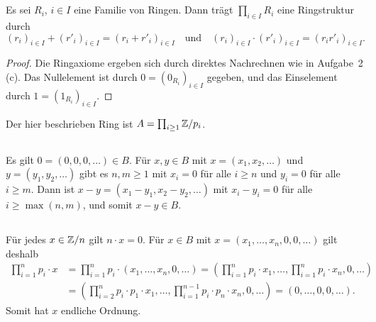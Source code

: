 \section{}





\subsection{}

\begin{lemma}
  Es sei $R_i$, $i \in I$ eine Familie von Ringen.
  Dann trägt $\prod_{i \in I} R_i$ eine Ringstruktur durch
  \[
      (r_i)_{i \in I} + (r'_i)_{i \in I}
    = (r_i + r'_i)_{i \in I}
    \quad\text{und}\quad
      (r_i)_{i \in I} \cdot (r'_i)_{i \in I}
    = (r_i r'_i)_{i \in I}.
  \]
\end{lemma}

\begin{proof}
  Die Ringaxiome ergeben sich durch direktes Nachrechnen wie in Aufgabe~2 (c).
  Das Nullelement ist durch $0 = (0_{R_i})_{i \in I}$ gegeben, und das Einselement durch $1 = (1_{R_i})_{i \in I}$.
\end{proof}

Der hier beschrieben Ring ist $A = \prod_{i \geq 1} \mathbb{Z}/{p_i}$.





\subsection{}

Es gilt $0 = (0, 0, 0, \dotsc) \in B$.
Für $x, y \in B$ mit $x = (x_1, x_2, \dotsc)$ und $y = (y_1, y_2, \dotsc)$ gibt es $n, m \geq 1$ mit $x_i = 0$ für alle $i \geq n$ und $y_i = 0$ für alle $i \geq m$.
Dann ist $x - y = (x_1 - y_1, x_2 - y_2, \dotsc)$ mit $x_i - y_i = 0$ für alle $i \geq \max(n,m)$, und somit $x-y \in B$.





\subsection{}

Für jedes $x \in \mathbb{Z}/n$ gilt $n \cdot x = 0$.
Für $x \in B$ mit $x = (x_1, \dotsc, x_n, 0, 0, \dotsc)$ gilt deshalb
\begin{align*}
      \prod_{i=1}^n p_i \cdot x
  &=  \prod_{i=1}^n p_i \cdot (x_1, \dotsc, x_n, 0, \dotsc)
   =  \left( 
        \prod_{i=1}^n p_i \cdot x_1,
        \dotsc,
        \prod_{i=1}^n p_i \cdot x_n,
        0,
        \dotsc
      \right)
  \\
  &=  \left(
        \prod_{i=2}^n p_i \cdot p_1 \cdot x_1,
        \dotsc,
        \prod_{i=1}^{n-1}  p_i \cdot p_n \cdot x_n, 0,
        \dotsc
      \right)
  = (0, \dotsc, 0, 0, \dotsc).
\end{align*}
Somit hat $x$ endliche Ordnung.





